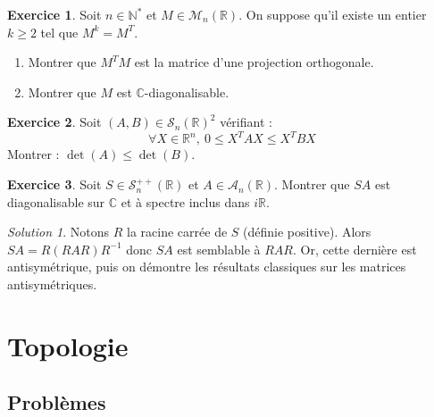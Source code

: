 \documentclass[french]{book}
\newcommand{\N}{\mathbb{N}}
\newcommand{\R}{\mathbb{R}}
\newcommand{\C}{\mathbb{C}}
\newcommand{\st}{^*}
\newcommand{\inv}{^{-1}}
\theoremstyle{definition}
\newtheorem{ex}{Exercice}[chapter]
\theoremstyle{remark}
\newtheorem*{sol}{Solution}
\begin{document}
\begin{ex}
	Soit $n\in\N\st$ et $M\in\mathcal{M}_n(\R)$. On suppose qu'il existe un entier $k\geqslant 2$ tel que $M^k=M^T$.
	\begin{enumerate}
		\item Montrer que $M^TM$ est la matrice d'une projection orthogonale.
		\item Montrer que $M$ est $\C$-diagonalisable.
	\end{enumerate}
\end{ex}

\begin{ex}
	Soit $(A,B)\in\mathcal{S}_n(\R)^2$ vérifiant : $$\forall X\in\R^n,\ 0\leqslant X^TAX\leqslant X^TBX$$ Montrer : $\det(A)\leqslant\det(B)$.
\end{ex}

\begin{ex}
	Soit $S\in\mathcal{S}_n^{++}(\R)$ et $A\in\mathcal{A}_n(\R)$. Montrer que $SA$ est diagonalisable sur $\C$ et à spectre inclus dans $i\R$.
\end{ex}
\begin{sol}
	Notons $R$ la racine carrée de $S$ (définie positive). Alors $SA=R(RAR)R\inv$ donc $SA$ est semblable à $RAR$. Or, cette dernière est antisymétrique, puis on démontre les résultats classiques sur les matrices antisymétriques.
\end{sol}

\chapter{Topologie}

\section{Problèmes}
\end{document}
